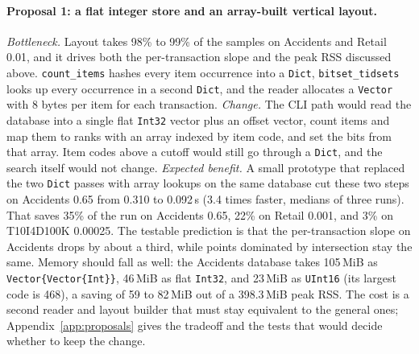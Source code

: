 \paragraph{Proposal 1: a flat integer store and an array-built vertical layout.}
\emph{Bottleneck.} Layout takes 98\% to 99\% of the samples on Accidents and Retail 0.01,
and it drives both the per-transaction slope and the peak RSS discussed above.
\texttt{count\_items} hashes every item occurrence into a \texttt{Dict},
\texttt{bitset\_tidsets} looks up every occurrence in a second \texttt{Dict}, and the
reader allocates a \texttt{Vector} with 8 bytes per item for each transaction.
\emph{Change.} The CLI path would read the database into a single flat \texttt{Int32}
vector plus an offset vector, count items and map them to ranks with an array indexed by
item code, and set the bits from that array. Item codes above a cutoff would still go
through a \texttt{Dict}, and the search itself would not change. \emph{Expected benefit.}
A small prototype that replaced the two \texttt{Dict} passes with array lookups on the
same database cut these two steps on Accidents 0.65 from 0.310 to 0.092\,s (3.4 times
faster, medians of three runs). That saves 35\% of the run on Accidents 0.65, 22\% on
Retail 0.001, and 3\% on T10I4D100K 0.00025. The testable prediction is that the
per-transaction slope on Accidents drops by about a third, while points dominated by
intersection stay the same. Memory should fall as well: the Accidents database takes
105\,MiB as \texttt{Vector\{Vector\{Int\}\}}, 46\,MiB as flat \texttt{Int32}, and
23\,MiB as \texttt{UInt16} (its largest code is 468), a saving of 59 to 82\,MiB out of a
398.3\,MiB peak RSS. The cost is a second reader and layout builder that must stay
equivalent to the general ones; Appendix~\ref{app:proposals} gives the tradeoff and the
tests that would decide whether to keep the change.

